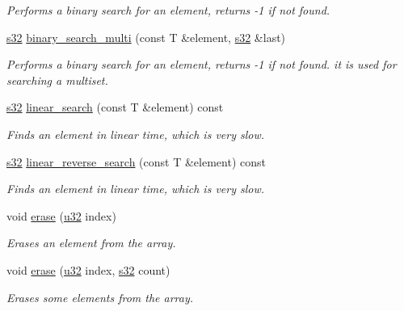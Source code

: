 \begin{DoxyCompactItemize}
\begin{DoxyCompactList}\small\item\em Performs a binary search for an element, returns -\/1 if not found. \end{DoxyCompactList}\item 
\hyperlink{namespaceirr_ac66849b7a6ed16e30ebede579f9b47c6}{s32} \hyperlink{classirr_1_1core_1_1array_a62821cac92125dd76f96f21e60ca94a4}{binary\+\_\+search\+\_\+multi} (const T \&element, \hyperlink{namespaceirr_ac66849b7a6ed16e30ebede579f9b47c6}{s32} \&last)
\begin{DoxyCompactList}\small\item\em Performs a binary search for an element, returns -\/1 if not found. it is used for searching a multiset. \end{DoxyCompactList}\item 
\hyperlink{namespaceirr_ac66849b7a6ed16e30ebede579f9b47c6}{s32} \hyperlink{classirr_1_1core_1_1array_a4b5002b36bb913a3680f2412ab2ee045}{linear\+\_\+search} (const T \&element) const
\begin{DoxyCompactList}\small\item\em Finds an element in linear time, which is very slow. \end{DoxyCompactList}\item 
\hyperlink{namespaceirr_ac66849b7a6ed16e30ebede579f9b47c6}{s32} \hyperlink{classirr_1_1core_1_1array_aef6726fc4de8ca5a01881e09664981ad}{linear\+\_\+reverse\+\_\+search} (const T \&element) const
\begin{DoxyCompactList}\small\item\em Finds an element in linear time, which is very slow. \end{DoxyCompactList}\item 
void \hyperlink{classirr_1_1core_1_1array_a5ba14e37dddaecd9c3e813a78c157dc8}{erase} (\hyperlink{namespaceirr_a0416a53257075833e7002efd0a18e804}{u32} index)
\begin{DoxyCompactList}\small\item\em Erases an element from the array. \end{DoxyCompactList}\item 
void \hyperlink{classirr_1_1core_1_1array_ab9bb8cb0e6ebc4839fa2f7bc8e626800}{erase} (\hyperlink{namespaceirr_a0416a53257075833e7002efd0a18e804}{u32} index, \hyperlink{namespaceirr_ac66849b7a6ed16e30ebede579f9b47c6}{s32} count)
\begin{DoxyCompactList}\small\item\em Erases some elements from the array. \end{DoxyCompactList}\item 

\end{DoxyCompactItemize}
